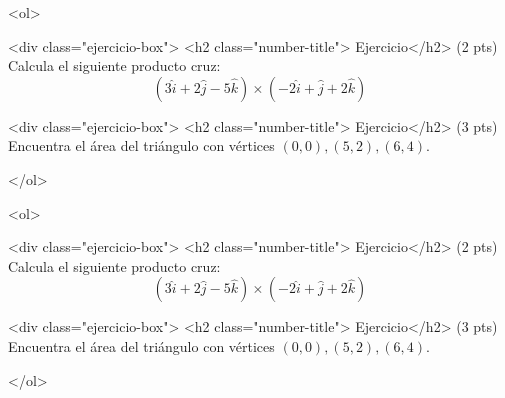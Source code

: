\documentclass[12pt]{article}
\begin{document}
\bigskip

            
\bigskip
\bigskip
\bigskip


<ol>

<div class="ejercicio-box"> <h2 class="number-title"> Ejercicio</h2> (2 pts) Calcula el siguiente producto cruz:
  $$(3\hat{i}+2\hat{j}-5\hat{k})\times (-2\hat{i}+\hat{j}+2\hat{k})$$

\vspace{3.5cm}
  
  <div class="ejercicio-box"> <h2 class="number-title"> Ejercicio</h2> (3 pts) Encuentra el área del triángulo con vértices $(0,0), (5,2), (6,4)$.

  </ol>


  \vspace{3cm}

  
\bigskip

            
\bigskip
\bigskip
\bigskip


<ol>

<div class="ejercicio-box"> <h2 class="number-title"> Ejercicio</h2> (2 pts) Calcula el siguiente producto cruz:
  $$(3\hat{i}+2\hat{j}-5\hat{k})\times (-2\hat{i}+\hat{j}+2\hat{k})$$

\vspace{3.5cm}
  
  <div class="ejercicio-box"> <h2 class="number-title"> Ejercicio</h2> (3 pts) Encuentra el área del triángulo con vértices $(0,0), (5,2), (6,4)$.

</ol>
  
\end{document}
